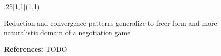 \documentclass[10pt, xcolor=table, dvipsnames]{beamer}
\begin{document}
	\begin{textblock}{.25}[1,1](1,1)
		\begin{tcolorbox}[title= {\centering Conclusion}]
			\begin{small} Reduction and convergence patterns generalize to freer-form and
			more naturalistic domain of a negotiation game
			\end{small}
			\begin{scriptsize}
				
				\textbf{References: }\noindent
				TODO
			\end{scriptsize}
\end{tcolorbox}
\end{textblock}
	
\end{document}
